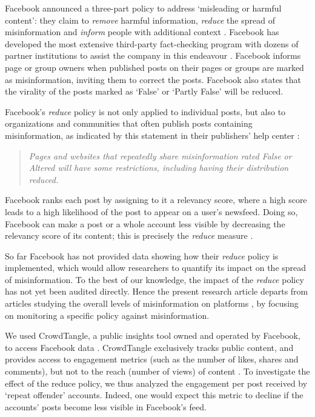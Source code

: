 \documentclass[review]{elsarticle}
\begin{document}
Facebook announced a three-part policy to address ‘misleading or harmful content’: they claim to \textit{remove} harmful information, \textit{reduce} the spread of misinformation and \textit{inform} people with additional context \citep{threePartRecipe}. 
Facebook has developed the most extensive third-party fact-checking program with dozens of partner institutions to assist the company in this endeavour \citep{60factCheckingPartners}.
Facebook informs page or group owners when published posts on their pages or groups are marked as misinformation, inviting them to correct the posts.
Facebook also states that the virality of the posts marked as `False' or `Partly False' will be reduced.

Facebook’s \textit{reduce} policy is not only applied to individual posts, but also to organizations and communities that often publish posts containing misinformation, as indicated by this statement in their publishers’ help center \citep{factCheckingRules, repeatOffenderCommunication}: 
\begin{quote}
\emph{Pages and websites that repeatedly share misinformation rated False or Altered will have some restrictions, including having their distribution reduced.}
\end{quote}
Facebook ranks each post by assigning to it a relevancy score, where a high score leads to a high likelihood of the post to appear on a user's newsfeed. 
Doing so, Facebook can make a post or a whole account less visible by decreasing the relevancy score of its content; this is precisely the {\it reduce} measure \citep{threePartRecipe}.

So far Facebook has not provided data showing how their {\it reduce} policy is implemented, which would allow researchers to quantify its impact on the spread of misinformation. 
To the best of our knowledge, the impact of the {\it reduce} policy has not yet been audited directly.
Hence the present research article departs from articles studying the overall levels of misinformation on platforms \citep{allcott2019trends, kornbluh2020new, resnick2018iffy}, by focusing on monitoring a specific policy against misinformation.

We used CrowdTangle, a public insights tool owned and operated by Facebook, to access Facebook data \citep{team2020crowdtangle}. 
CrowdTangle exclusively tracks public content, and provides access to engagement metrics (such as the number of likes, shares and comments), but not to the reach (number of views) of content \citep{helpCT}.
To investigate the effect of the reduce policy, we thus analyzed the engagement per post received by `repeat offender' accounts. 
Indeed, one would expect this metric to decline if the accounts’ posts become less visible in Facebook’s feed.
 
\end{document}
